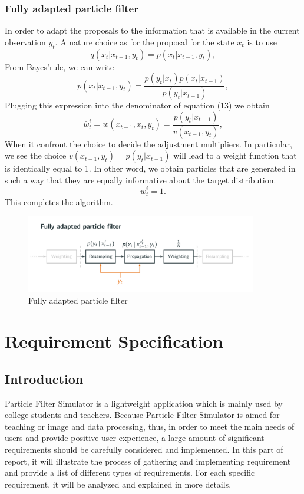 \documentclass[11pt,oneside,a4paper]{article}
\begin{document}
\subsubsection{Fully adapted particle filter}
In order to adapt the proposals to the information that is available in the current observation $y_{t} $. A nature choice as for the proposal for the state $x_{t} $ is to use
\begin{equation}
  q(x_{t}|x_{t-1}, y_{t}) = p(x_{t}|x_{t-1}, y_{t}),
\end{equation}
From Bayes'rule, we can write
\begin{equation}
  p(x_{t}|x_{t-1}, y_{t}) = \frac{p(y_{t}|x_{t}) p(x_{t}|x_{t-1})}{p(y_{t}|x_{t-1})},
\end{equation}
Plugging this expression into the denominator of equation (13) we obtain
\begin{equation}
\bar{w}_{t}^{i} = w(x_{t-1}, x_{t}, y_{t}) = \frac{p(y_{t} | x_{t-1})}{v(x_{t-1}, y_{t})},
\end{equation}
When it confront the choice to decide the adjustment multipliers. In particular, we see the choice $v(x_{t-1}, y_{t}) = p(y_{t}|x_{t-1}) $ will lead to a weight function that is identically equal to 1. In other word, we obtain particles that are generated in such a way that they are equally informative about the
target distribution.
\begin{equation}
  \bar{w}_{t}^{i} = 1.
\end{equation}
This completes the algorithm.
\begin{figure}[H]
  \begin{center}
  \includegraphics[width=0.9\textwidth]{./source/PF/7.png}
  \caption{Fully adapted particle filter}
  \label{}
  \end{center}
\end{figure}

\section{Requirement Specification}
\subsection{Introduction}
Particle Filter Simulator is a lightweight application which is mainly used by college students and teachers. Because Particle Filter Simulator is aimed for teaching or image and data processing, thus, in order to meet the main needs of users and provide positive user experience,
a large amount of significant requirements should be carefully considered and implemented. In this part of report, it will illustrate the process of gathering and implementing requirement and provide a list of different types of requirements. For each specific requirement,
it will be analyzed and explained in more details.
\end{document}
